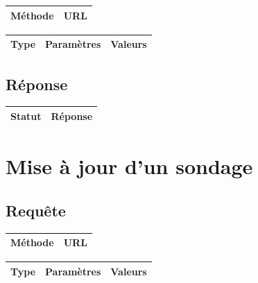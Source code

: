\documentclass[titlepage]{report}
\begin{document}
\begin{center}
	\begin{tabular}{|c|c|}
		\hline
		Méthode & URL \\
		\hline
		
	\end{tabular}
\end{center}


\begin{center}
	\begin{tabular}{|c|c|c|}
		\hline
		Type & Paramètres & Valeurs \\
		\hline
		
	\end{tabular}
\end{center}


\section{Réponse}

\begin{center}
	\begin{tabular}{|c|c|}
		\hline
		Statut & Réponse \\
		\hline
		
	\end{tabular}
\end{center}


\chapter{Mise à jour d'un sondage}

\section{Requête}

\begin{center}
	\begin{tabular}{|c|c|}
		\hline
		Méthode & URL \\
		\hline
		
	\end{tabular}
\end{center}


\begin{center}
	\begin{tabular}{|c|c|c|}
		\hline
		Type & Paramètres & Valeurs \\
		\hline
		
	\end{tabular}
\end{center}
\end{document}
